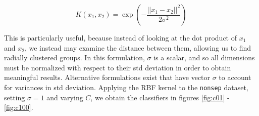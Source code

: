 \documentclass[10pt,letterpaper]{article}
\begin{document}
\begin{equation}
K(x_1,x_2) = \exp\left( -\dfrac{||x_1-x_2||^2}{2\sigma^2} \right)
\end{equation}

This is particularly useful, because instead of looking at the dot product of $x_1$ and $x_2$, we instead may examine the distance between them, allowing us to find radially clustered groups. In this formulation, $\sigma$ is a scalar, and so all dimensions must be normalized with respect to their std deviation in order to obtain meaningful results. Alternative formulations exist that have vector $\sigma$ to account for variances in std deviation. Applying the RBF kernel to the \texttt{nonsep} dataset, setting $\sigma = 1$ and varying $C$, we obtain the classifiers in figures \ref{fig:c01} - \ref{fig:c100}.
\end{document}
